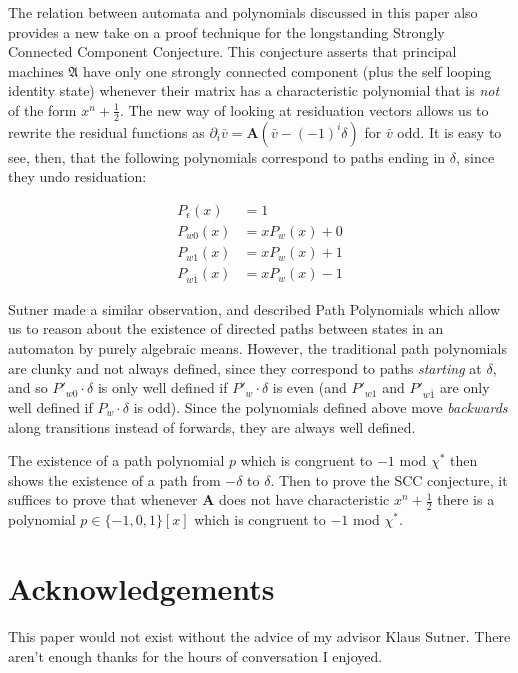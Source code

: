 \documentclass[runningheads]{llncs}
\renewcommand{\P}{\mathfrak{A}}
\newcommand{\2}{\textbf{2}}
\newcommand{\Am}{\textbf{A}}
\newcommand{\del}{\partial}
\newcommand{\vv}{\bar{v}}
\begin{document}
The relation between automata and polynomials discussed in this paper 
also provides a new take on a proof technique for the longstanding
Strongly Connected Component Conjecture. This conjecture 
asserts that principal machines $\P$ have only one strongly connected component 
(plus the self looping identity state) whenever their matrix has a 
characteristic polynomial that is \emph{not} of the form $x^n + \frac{1}{2}$.
The new way of looking at residuation vectors allows us to rewrite the 
residual functions as $\del_i \vv = \Am (\vv - (-1)^i \delta)$ for $\vv$ odd.
It is easy to see, then, that the following polynomials correspond to paths
ending in $\delta$, since they undo residuation:

\begin{align*}
  P_\epsilon(x)   &= 1\\
  P_{w0}(x)       &= xP_w(x) + 0\\
  P_{w1}(x)       &= xP_w(x) + 1\\
  P_{w\bar{1}}(x) &= xP_w(x) - 1
\end{align*}

Sutner made a similar observation, and described Path Polynomials 
\cite{Sutner18:abelian_automata} which
allow us to reason about the existence of directed paths between states 
in an automaton by purely algebraic means. However, the traditional path 
polynomials are clunky and not always defined, since they correspond to paths
\emph{starting} at $\delta$, and so $P'_{w0} \cdot \delta$ is only well 
defined if $P'_w \cdot \delta$ is even (and $P'_{w1}$ and $P'_{w\bar{1}}$ 
are only well defined if $P_w \cdot \delta$ is odd). Since the polynomials 
defined above move \emph{backwards} along transitions instead of forwards, 
they are always well defined.

The existence of a path polynomial $p$ which is congruent to $-1$ mod $\chi^*$
then shows the existence of a path from $-\delta$ to $\delta$.
Then to prove the SCC conjecture, it suffices to prove that whenever $\Am$ 
does not have characteristic $x^n + \frac{1}{2}$ there is a polynomial 
$p \in \{-1,0,1\}[x]$ which is congruent to $-1$ mod $\chi^*$. 

\section*{Acknowledgements}
This paper would not exist without the advice of my advisor Klaus Sutner.
There aren't enough thanks for the hours of conversation I enjoyed.

\newpage



\end{document}

